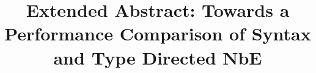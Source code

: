 \documentclass[sigplan,nonacm]{acmart}
\title{Extended Abstract: Towards a Performance Comparison of Syntax and Type Directed NbE}
\begin{document}
\begin{abstract}
        
\end{abstract}

\maketitle


%


%

\end{document}
